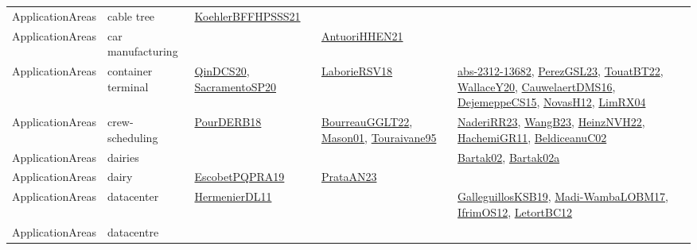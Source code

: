 {\begin{longtable}{lp{3cm}>{\raggedright}p{6cm}>{\raggedright}p{6cm}p{8cm}}
ApplicationAreas & cable tree & \href{articles/KoehlerBFFHPSSS21.pdf}{KoehlerBFFHPSSS21}\cite{KoehlerBFFHPSSS21} &  & \\
ApplicationAreas & car manufacturing &  & \href{papers/AntuoriHHEN21.pdf}{AntuoriHHEN21}\cite{AntuoriHHEN21} & \\
ApplicationAreas & container terminal & \href{articles/QinDCS20.pdf}{QinDCS20}\cite{QinDCS20}, \href{articles/SacramentoSP20.pdf}{SacramentoSP20}\cite{SacramentoSP20} & \href{articles/LaborieRSV18.pdf}{LaborieRSV18}\cite{LaborieRSV18} & \href{articles/abs-2312-13682.pdf}{abs-2312-13682}\cite{abs-2312-13682}, \href{papers/PerezGSL23.pdf}{PerezGSL23}\cite{PerezGSL23}, \href{papers/TouatBT22.pdf}{TouatBT22}\cite{TouatBT22}, \href{articles/WallaceY20.pdf}{WallaceY20}\cite{WallaceY20}, \href{papers/CauwelaertDMS16.pdf}{CauwelaertDMS16}\cite{CauwelaertDMS16}, \href{papers/DejemeppeCS15.pdf}{DejemeppeCS15}\cite{DejemeppeCS15}, \href{articles/NovasH12.pdf}{NovasH12}\cite{NovasH12}, \href{papers/LimRX04.pdf}{LimRX04}\cite{LimRX04}\\
ApplicationAreas & crew-scheduling & \href{articles/PourDERB18.pdf}{PourDERB18}\cite{PourDERB18} & \href{articles/BourreauGGLT22.pdf}{BourreauGGLT22}\cite{BourreauGGLT22}, \href{articles/Mason01.pdf}{Mason01}\cite{Mason01}, \href{papers/Touraivane95.pdf}{Touraivane95}\cite{Touraivane95} & \href{articles/NaderiRR23.pdf}{NaderiRR23}\cite{NaderiRR23}, \href{papers/WangB23.pdf}{WangB23}\cite{WangB23}, \href{articles/HeinzNVH22.pdf}{HeinzNVH22}\cite{HeinzNVH22}, \href{articles/HachemiGR11.pdf}{HachemiGR11}\cite{HachemiGR11}, \href{papers/BeldiceanuC02.pdf}{BeldiceanuC02}\cite{BeldiceanuC02}\\
ApplicationAreas & dairies &  &  & \href{papers/Bartak02.pdf}{Bartak02}\cite{Bartak02}, \href{papers/Bartak02a.pdf}{Bartak02a}\cite{Bartak02a}\\
ApplicationAreas & dairy & \href{articles/EscobetPQPRA19.pdf}{EscobetPQPRA19}\cite{EscobetPQPRA19} & \href{articles/PrataAN23.pdf}{PrataAN23}\cite{PrataAN23} & \\
ApplicationAreas & datacenter & \href{papers/HermenierDL11.pdf}{HermenierDL11}\cite{HermenierDL11} &  & \href{papers/GalleguillosKSB19.pdf}{GalleguillosKSB19}\cite{GalleguillosKSB19}, \href{papers/Madi-WambaLOBM17.pdf}{Madi-WambaLOBM17}\cite{Madi-WambaLOBM17}, \href{papers/IfrimOS12.pdf}{IfrimOS12}\cite{IfrimOS12}, \href{papers/LetortBC12.pdf}{LetortBC12}\cite{LetortBC12}\\
ApplicationAreas & datacentre &  &  & \\

\end{longtable}}
